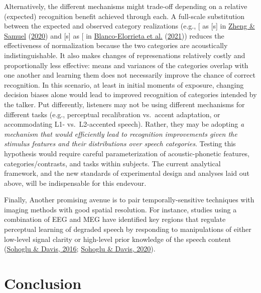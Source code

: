 \documentclass[
  11pt,
  english,
  man,floatsintext]{apa6}
\begin{document}
Alternatively, the different mechanisms might trade-off depending on a relative (expected) recognition benefit achieved through each. A full-scale substitution between the expected and observed category realizations (e.g., {[}\ipatext{θ}{]} as {[}s{]} in \protect\hyperlink{ref-zheng-samuel2020}{Zheng \& Samuel} (\protect\hyperlink{ref-zheng-samuel2020}{2020}) and {[}s{]} as {[}\ipatext{ʃ}{]} in \protect\hyperlink{ref-blanco-elorriera2021}{Blanco-Elorrieta et al.} (\protect\hyperlink{ref-blanco-elorriera2021}{2021})) reduces the effectiveness of normalization because the two categories are acoustically indistinguishable. It also makes changes of represenations relatively costly and proportionally less effective: means and variances of the categories overlap with one another and learning them does not necessarily improve the chance of correct recognition. In this scenario, at least in initial moments of exposure, changing decision biases alone would lead to improved recognition of categories intended by the talker. Put differently, listeners may not be using different mechanisms for different tasks (e.g., perceptual recalibration vs.~accent adaptation, or accommodating L1- vs.~L2-accented speech). Rather, they may be adopting \emph{a mechanism that would efficiently lead to recognition improvements given the stimulus features and their distributions over speech categories}. Testing this hypothesis would require careful parameterization of acoustic-phonetic features, categories/contrasts, and tasks within subjects. The current analytical framework, and the new standards of experimental design and analyses laid out above, will be indispensable for this endevour.

Finally, Another promising avenue is to pair temporally-sensitive techniques with imaging methods with good spatial resolution. For instance, studies using a combination of EEG and MEG have identified key regions that regulate perceptual learning of degraded speech by responding to manipulations of either low-level signal clarity or high-level prior knowledge of the speech content (\protect\hyperlink{ref-sohoglu-davis2016}{Sohoglu \& Davis, 2016}; \protect\hyperlink{ref-sohoglu-davis2020}{Sohoglu \& Davis, 2020}).

\hypertarget{conclusion}{%
\section{Conclusion}\label{conclusion}}
\end{document}
